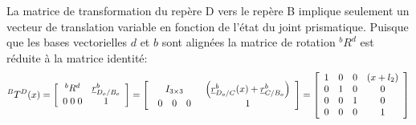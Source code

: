 \begin{example}
La matrice de transformation du repère D vers le repère B implique seulement un vecteur de translation variable en fonction de l'état du joint prismatique. Puisque que les bases vectorielles $d$ et $b$ sont alignées la matrice de rotation $^bR^d$ est réduite à la matrice identité:
\begin{align}
^BT^D(x) 
= 
\left[ \begin{array}{c c } 
^bR^d  & \underline{r}_{D_o/B_o}^b \\ 0 \; 0 \; 0 & 1
\end{array} \right] 
= \left[ \begin{array}{c c } 
I_{3\times3} & \left( \underline{r}_{D_o/C}^b(x) + \underline{r}_{C/B_o}^b \right) \\ 
\begin{array}{c c c} 
0 & 0 & 0 
\end{array} & 1
\end{array} \right] 
= 
\left[ \begin{array}{c c c c} 
  1 & 0 & 0 & (x + l_2)  \\
	0 & 1 & 0 & 0  \\
	0 & 0 & 1 & 0  \\ 
	0 & 0 & 0 & 1
\end{array} \right]
\end{align} 


\end{example}
